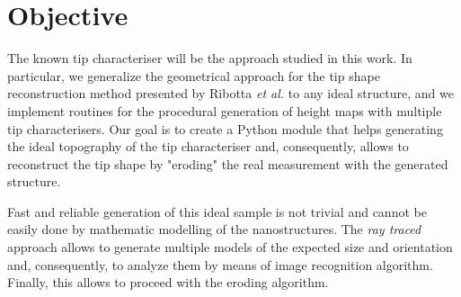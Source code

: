 \section{Objective}

The known tip characteriser will be the approach studied in this work. In particular, we generalize the geometrical approach for the tip shape reconstruction method presented by Ribotta \textit{et al.} \cite{ribotta1,ribotta2,other_morphological} to any ideal structure, and we implement routines for the procedural generation of height maps with multiple tip characterisers. Our goal is to create a Python module that helps generating the ideal topography of the tip characteriser and, consequently, allows to reconstruct the tip shape by "eroding" the real measurement with the generated structure.

\vspace{10pt}

Fast and reliable generation of this ideal sample is not trivial and cannot be easily done by mathematic modelling of the nanostructures. The \textit{ray traced} approach allows to generate multiple models of the expected size and orientation and, consequently, to analyze them by means of image recognition algorithm. Finally, this allows to proceed with the eroding algorithm.
